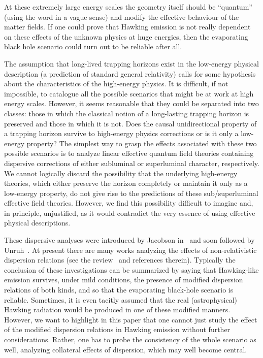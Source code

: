 \documentclass[12pt]{article}
\begin{document}
At these extremely large energy scales the geometry itself should be
``quantum'' (using the word in a vague sense) and modify the effective behaviour
of the matter fields.  If one could  prove that Hawking emission is not
really dependent on these effects of the unknown physics at huge energies, then
the evaporating black hole scenario could turn out to be reliable after all. 

The assumption that long-lived trapping horizons exist in the low-energy physical description (a prediction of standard general relativity) calls for some hypothesis about the characteristics of the high-energy physics. It is difficult, if not impossible, to catalogue all the possible scenarios that might be at work at high energy scales.  However, it seems reasonable that they
could be separated into two classes: those in which the classical notion of a
long-lasting trapping horizon is preserved and those in which it is not.  Does
the causal unidirectional property of a trapping horizon survive to high-energy
physics corrections or  is it only a low-energy property? The simplest way to
grasp the effects associated with these two possible scenarios is to analyze
linear effective quantum field theories containing dispersive corrections of either
subluminal or superluminal character, respectively. We cannot logically discard the
possibility that the underlying high-energy theories, which either preserve the horizon completely or maintain it only as a low-energy property, do not give rise to the
predictions of these sub/superluminal effective field theories. However, we find this
possibility difficult to imagine and, in principle, unjustified, as it would contradict the very essence of using effective physical descriptions. 

These dispersive analyses were introduced by Jacobson in~\cite{jacobson,jacobson2} and soon
followed by Unruh~\cite{unruh-sub}. At present there are many works analyzing
the effects of non-relativistic dispersion relations (see the
review~\cite{barcelo-lrr} and references therein). 
Typically the conclusion of these investigations can be summarized by saying
that Hawking-like emission survives, under mild conditions, the presence of
modified dispersion relations of both kinds, and so that the evaporating
black-hole scenario is reliable. Sometimes, it is even tacitly assumed that the
real (astrophysical) Hawking radiation would be produced in one of these modified manners. 
However,  we want to highlight in this paper  that one cannot just study the
effect of the modified dispersion relations in Hawking emission without further
considerations. Rather, one has to probe the consistency of the whole scenario as
well, analyzing collateral effects of dispersion, which may well become central.
\end{document}

